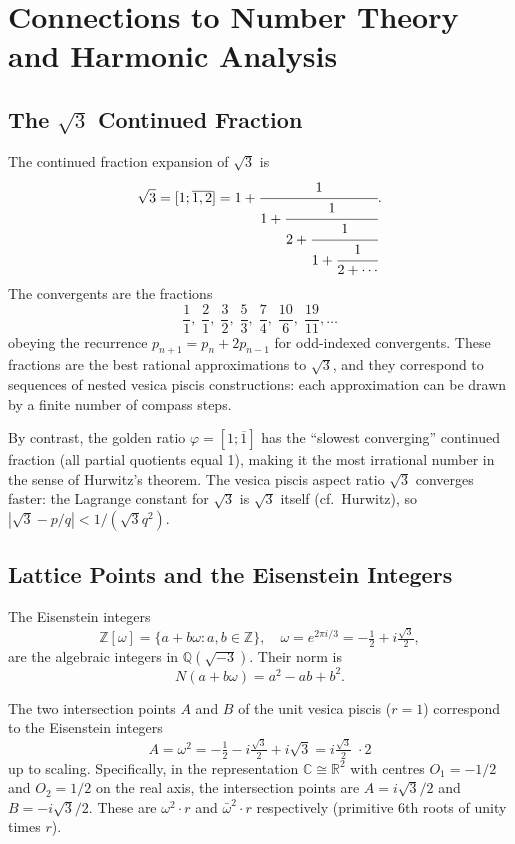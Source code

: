 \section{Connections to Number Theory and Harmonic Analysis}
\label{sec:ch11-number-theory}

\subsection{The \(\sqrt{3}\) Continued Fraction}
\label{subsec:ch11-cf}

The continued fraction expansion of \(\sqrt{3}\) is
\[
  \sqrt{3} = [1; \overline{1, 2}] = 1 + \cfrac{1}{1 + \cfrac{1}{2 + \cfrac{1}{1 + \cfrac{1}{2 + \cdots}}}}.
\]
The convergents are the fractions
\[
  \frac{1}{1},\; \frac{2}{1},\; \frac{3}{2},\; \frac{5}{3},\; \frac{7}{4},\; \frac{10}{6},\; \frac{19}{11}, \ldots
\]
obeying the recurrence
\(p_{n+1} = p_n + 2 p_{n-1}\) for odd-indexed convergents.
These fractions are the best rational approximations to \(\sqrt{3}\),
and they correspond to sequences of nested vesica piscis constructions:
each approximation can be drawn by a finite number of compass steps.

By contrast, the golden ratio \(\varphi = [1; \overline{1}]\) has the
``slowest converging'' continued fraction (all partial quotients equal 1),
making it the most irrational number in the sense of Hurwitz's theorem.
The vesica piscis aspect ratio \(\sqrt{3}\) converges faster: the
Lagrange constant for \(\sqrt{3}\) is \(\sqrt{3}\) itself
(cf.\ Hurwitz), so \(|\sqrt{3} - p/q| < 1/(\sqrt{3} q^2)\).

\subsection{Lattice Points and the Eisenstein Integers}
\label{subsec:ch11-eisenstein}

The Eisenstein integers
\[
  \mathbb{Z}[\omega] = \{a + b\omega : a, b \in \mathbb{Z}\},
  \quad \omega = e^{2\pi i/3} = -\tfrac{1}{2} + i\tfrac{\sqrt{3}}{2},
\]
are the algebraic integers in \(\mathbb{Q}(\sqrt{-3})\).
Their norm is
\[
  N(a + b\omega) = a^2 - ab + b^2.
\]

\begin{proposition}
\label{prop:eisenstein}
The two intersection points \(A\) and \(B\) of the unit vesica piscis
(\(r=1\)) correspond to the Eisenstein integers
\[
  A = \omega^2 = -\tfrac{1}{2} - i\tfrac{\sqrt{3}}{2} + i\sqrt{3} = i\tfrac{\sqrt{3}}{2}\; \cdot 2
\]
up to scaling.
Specifically, in the representation
\(\mathbb{C} \cong \mathbb{R}^2\) with centres
\(O_1 = -1/2\) and \(O_2 = 1/2\) on the real axis,
the intersection points are
\(A = i\sqrt{3}/2\) and \(B = -i\sqrt{3}/2\).
These are \(\omega^2 \cdot r\) and \(\bar{\omega}^2 \cdot r\) respectively
(primitive 6th roots of unity times \(r\)).
\end{proposition}


